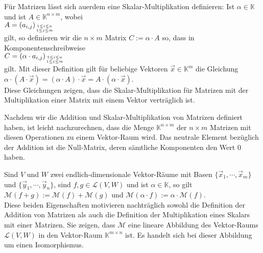 F\"{u}r Matrizen l\"{a}sst sich au\3erdem eine Skalar-Multiplikation definieren:  Ist $\alpha \in \mathbb{K}$
und ist $A \in \mathbb{K}^{n \times m}$, wobei
\\[0.2cm]
\hspace*{1.3cm}
$A = (a_{i,j})_{1\leq i \leq n \atop 1 \leq j \leq m}$
\\[0.2cm]
gilt, so definieren wir die $n \times m$ Matrix 
$C := \alpha \cdot A$ so, dass in Komponentenschreibweise
\\[0.2cm]
\hspace*{1.3cm}
$C = (\alpha \cdot a_{i,j})_{1\leq i \leq n \atop 1 \leq j \leq m}$ 
\\[0.2cm]
gilt.  Mit
dieser Definition gilt f\"{u}r beliebige Vektoren $\vec{x} \in \mathbb{K}^m$ die Gleichung
\\[0.2cm]
\hspace*{1.3cm}
$\alpha \cdot (A \cdot \vec{x}) = (\alpha \cdot A) \cdot \vec{x} = A \cdot (\alpha \cdot \vec{x})$.
\\[0.2cm]
Diese Gleichungen zeigen, dass die Skalar-Multiplikation f\"{u}r Matrizen mit der Multiplikation einer
Matrix mit einem Vektor vertr\"{a}glich ist.

\remark
Nachdem wir die Addition und Skalar-Multiplikation von Matrizen definiert haben, ist leicht
nachzurechnen, dass die Menge $\mathbb{K}^{n \times m}$ der $n \times m$ Matrizen mit diesen
Operationen zu einem Vektor-Raum wird.  Das neutrale Element bez\"{u}glich der Addition ist die
Null-Matrix, deren s\"{a}mtliche Komponenten den Wert $0$ haben.

\remark
Sind $V$ und $W$ zwei endlich-dimensionale Vektor-R\"{a}ume mit Basen
$\{\vec{x}_1, \cdots, \vec{x}_m\}$ und $\{\vec{y}_1, \cdots, \vec{y}_n\}$, sind $f, g \in \mathcal{L}(V, W)$ und ist $\alpha \in \mathbb{K}$, so gilt
\\[0.2cm]
\hspace*{1.3cm}
$\mathcal{M}(f+g) := \mathcal{M}(f) + \mathcal{M}(g)$ \quad und \quad
$\mathcal{M}(\alpha \cdot f) := \alpha \cdot \mathcal{M}(f)$.
\\[0.2cm]
Diese beiden Eigenschaften motivieren nachtr\"{a}glich sowohl die Definition der Addition von Matrizen
als auch die Definition der Multiplikation eines Skalars mit einer Matrizen.  
Sie zeigen, dass $\mathcal{M}$ eine lineare Abbildung des Vektor-Raums $\mathcal{L}(V,W)$ in den Vektor-Raum $\mathbb{K}^{m \times n}$ ist.  
Es handelt sich bei dieser Abbildung um einen Isomorphismus.
\eoxs



